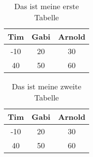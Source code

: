 \documentclass{article}
\begin{document}
\begin{table}
\centering
\begin{tabular}{|c|c|c|}
Tim & Gabi & Arnold\\ \hline
-10 & 20 & 30\\
 40 & 50 & 60
\end{tabular}
\caption{Das ist meine erste Tabelle}
\end{table}

\begin{table}
\centering
\begin{tabular}{|c|c|c|}
Tim & Gabi & Arnold\\ \hline
-10 & 20 & 30\\
 40 & 50 & 60
\end{tabular}
\caption{Das ist meine zweite Tabelle}
\end{table}
\newpage
\listoftables
\end{document}
